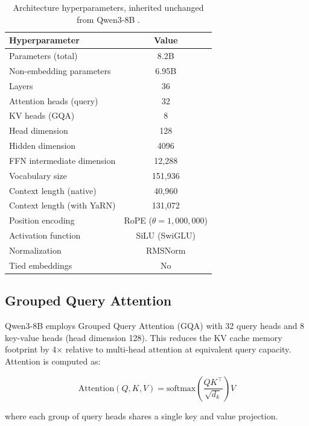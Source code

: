 \documentclass[11pt,a4paper]{article}
\begin{document}
\begin{table}[H]
\centering
\caption{Architecture hyperparameters, inherited unchanged from Qwen3-8B \cite{qwen3hf}.}
\label{tab:arch}
\begin{tabular}{lc}
\toprule
\textbf{Hyperparameter} & \textbf{Value} \\
\midrule
Parameters (total)         & 8.2B \\
Non-embedding parameters   & 6.95B \\
Layers                     & 36 \\
Attention heads (query)    & 32 \\
KV heads (GQA)             & 8 \\
Head dimension             & 128 \\
Hidden dimension           & 4096 \\
FFN intermediate dimension & 12{,}288 \\
Vocabulary size            & 151{,}936 \\
Context length (native)    & 40{,}960 \\
Context length (with YaRN) & 131{,}072 \\
Position encoding          & RoPE ($\theta = 1{,}000{,}000$) \\
Activation function        & SiLU (SwiGLU) \\
Normalization              & RMSNorm \\
Tied embeddings            & No \\
\bottomrule
\end{tabular}
\end{table}

\subsection{Grouped Query Attention}

Qwen3-8B employs Grouped Query Attention (GQA) \cite{ainslie2023gqa} with 32 query heads and 8
key-value heads (head dimension 128). This reduces the KV cache memory footprint by 4$\times$
relative to multi-head attention at equivalent query capacity. Attention is computed as:

\begin{equation}
  \text{Attention}(Q, K, V) = \text{softmax}\!\left(\frac{QK^\top}{\sqrt{d_k}}\right)V
\end{equation}

where each group of query heads shares a single key and value projection.
\end{document}
